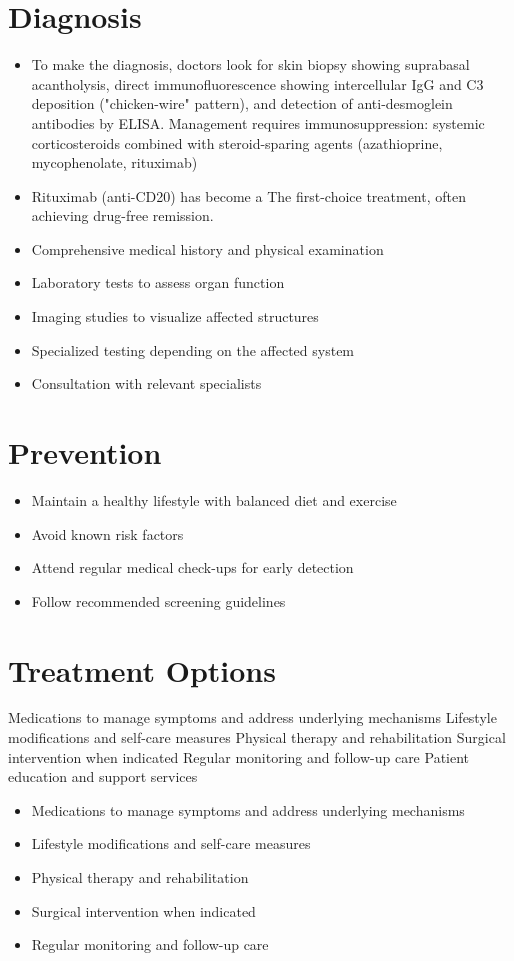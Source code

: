 \section{Diagnosis}
\begin{itemize}[noitemsep]
  \item To make the diagnosis, doctors look for skin biopsy showing suprabasal acantholysis, direct immunofluorescence showing intercellular IgG and C3 deposition ("chicken-wire" pattern), and detection of anti-desmoglein antibodies by ELISA. Management requires immunosuppression: systemic corticosteroids combined with steroid-sparing agents (azathioprine, mycophenolate, rituximab)
  \item Rituximab (anti-CD20) has become a The first-choice treatment, often achieving drug-free remission.
  \item Comprehensive medical history and physical examination
  \item Laboratory tests to assess organ function
  \item Imaging studies to visualize affected structures
  \item Specialized testing depending on the affected system
  \item Consultation with relevant specialists
\end{itemize}
\section{Prevention}
\begin{itemize}[noitemsep]
  \item Maintain a healthy lifestyle with balanced diet and exercise
  \item Avoid known risk factors
  \item Attend regular medical check-ups for early detection
  \item Follow recommended screening guidelines
\end{itemize}
\section{Treatment Options}
Medications to manage symptoms and address underlying mechanisms Lifestyle modifications and self-care measures Physical therapy and rehabilitation Surgical intervention when indicated Regular monitoring and follow-up care Patient education and support services

\begin{itemize}[noitemsep]
  \item Medications to manage symptoms and address underlying mechanisms
  \item Lifestyle modifications and self-care measures
  \item Physical therapy and rehabilitation
  \item Surgical intervention when indicated
  \item Regular monitoring and follow-up care
\end{itemize}
